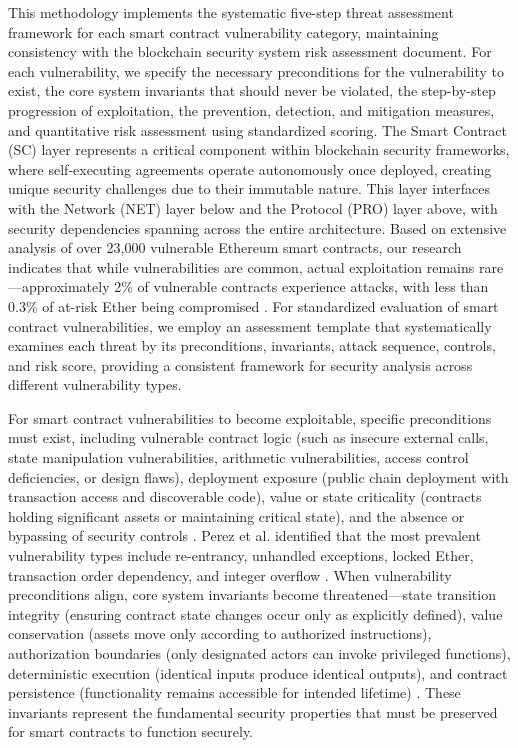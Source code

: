 This methodology implements the systematic five-step threat assessment framework for each smart contract vulnerability category, maintaining consistency with the blockchain security system risk assessment document. For each vulnerability, we specify the necessary preconditions for the vulnerability to exist, the core system invariants that should never be violated, the step-by-step progression of exploitation, the prevention, detection, and mitigation measures, and quantitative risk assessment using standardized scoring. The Smart Contract (SC) layer represents a critical component within blockchain security frameworks, where self-executing agreements operate autonomously once deployed, creating unique security challenges due to their immutable nature. This layer interfaces with the Network (NET) layer below and the Protocol (PRO) layer above, with security dependencies spanning across the entire architecture. Based on extensive analysis of over 23,000 vulnerable Ethereum smart contracts, our research indicates that while vulnerabilities are common, actual exploitation remains rare—approximately 2\% of vulnerable contracts experience attacks, with less than 0.3\% of at-risk Ether being compromised \cite{perez2021analysis}. For standardized evaluation of smart contract vulnerabilities, we employ an assessment template that systematically examines each threat by its preconditions, invariants, attack sequence, controls, and risk score, providing a consistent framework for security analysis across different vulnerability types.

For smart contract vulnerabilities to become exploitable, specific preconditions must exist, including vulnerable contract logic (such as insecure external calls, state manipulation vulnerabilities, arithmetic vulnerabilities, access control deficiencies, or design flaws), deployment exposure (public chain deployment with transaction access and discoverable code), value or state criticality (contracts holding significant assets or maintaining critical state), and the absence or bypassing of security controls \cite{praitheeshan2019systematic}. Perez et al. identified that the most prevalent vulnerability types include re-entrancy, unhandled exceptions, locked Ether, transaction order dependency, and integer overflow \cite{perez2021analysis}. When vulnerability preconditions align, core system invariants become threatened—state transition integrity (ensuring contract state changes occur only as explicitly defined), value conservation (assets move only according to authorized instructions), authorization boundaries (only designated actors can invoke privileged functions), deterministic execution (identical inputs produce identical outputs), and contract persistence (functionality remains accessible for intended lifetime) \cite{Wang2019}. These invariants represent the fundamental security properties that must be preserved for smart contracts to function securely.

